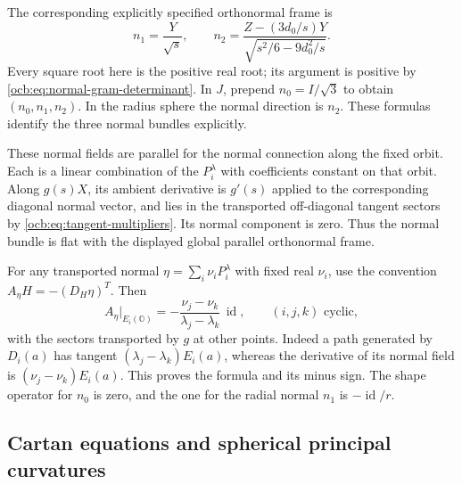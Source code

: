 \documentclass[11pt]{article}
\theoremstyle{definition}
\begin{document}
The corresponding explicitly specified orthonormal frame is
\begin{equation}
 n_1=\frac{Y}{\sqrt s},\qquad
 n_2=\frac{Z-(3d_0/s)Y}{\sqrt{s^2/6-9d_0^2/s}}.
 \label{ocb:eq:orthonormal-frame}\tag{OCB26}
\end{equation}
Every square root here is the positive real root; its argument is
positive by \eqref{ocb:eq:normal-gram-determinant}. In $J$, prepend
$n_0=I/\sqrt3$ to obtain $(n_0,n_1,n_2)$. In the radius sphere the
normal direction is $n_2$. These formulas identify the three normal
bundles explicitly.

These normal fields are parallel for the normal connection along the
fixed orbit. Each is a linear combination of the $P_i^\lambda$ with
coefficients constant on that orbit. Along $g(s)X$, its ambient
derivative is $g'(s)$ applied to the corresponding diagonal normal
vector, and lies in the transported off-diagonal tangent sectors by
\eqref{ocb:eq:tangent-multipliers}. Its normal component is zero.
Thus the normal bundle is flat with the displayed global parallel
orthonormal frame.

For any transported normal $\eta=\sum_i\nu_iP_i^\lambda$ with fixed
real $\nu_i$, use the convention $A_\eta H=-(D_H\eta)^T$. Then
\begin{equation}
 A_\eta\big|_{E_i(\mathbb O)}
 =-\frac{\nu_j-\nu_k}{\lambda_j-\lambda_k}\,\operatorname{id},
 \qquad(i,j,k)\text{ cyclic},
 \label{ocb:eq:shape-operator}\tag{OCB27}
\end{equation}
with the sectors transported by $g$ at other points. Indeed a path
generated by $D_i(a)$ has tangent
$(\lambda_j-\lambda_k)E_i(a)$, whereas the derivative of its
normal field is $(\nu_j-\nu_k)E_i(a)$. This proves the formula
and its minus sign. The shape operator for $n_0$ is zero, and the
one for the radial normal $n_1$ is $-\operatorname{id}/r$.

\subsection{Cartan equations and spherical principal curvatures}
\label{ocb:sec:cartan-equations}
\end{document}
